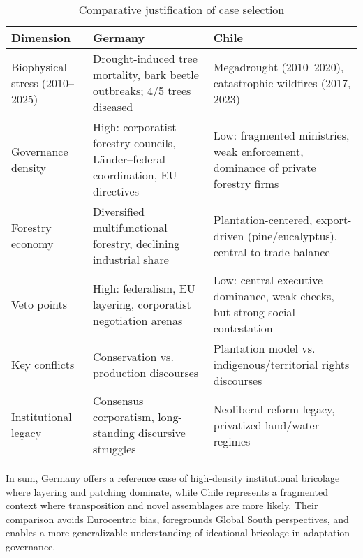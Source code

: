 \begin{table}[h!]
\centering
\caption{Comparative justification of case selection}
\begin{tabular}{@{}p{4cm}p{5cm}p{5cm}@{}}
\toprule
\textbf{Dimension} & \textbf{Germany} & \textbf{Chile} \\ \midrule
Biophysical stress (2010--2025) & Drought-induced tree mortality, bark beetle outbreaks; 4/5 trees diseased \parencite{BMEL2023} & Megadrought (2010--2020), catastrophic wildfires (2017, 2023) \\
Governance density & High: corporatist forestry councils, Länder–federal coordination, EU directives & Low: fragmented ministries, weak enforcement, dominance of private forestry firms \\
Forestry economy & Diversified multifunctional forestry, declining industrial share & Plantation-centered, export-driven (pine/eucalyptus), central to trade balance \\
Veto points & High: federalism, EU layering, corporatist negotiation arenas & Low: central executive dominance, weak checks, but strong social contestation \\
Key conflicts & Conservation vs. production discourses & Plantation model vs. indigenous/territorial rights discourses \\
Institutional legacy & Consensus corporatism, long-standing discursive struggles \parencite{Winkel2011} & Neoliberal reform legacy, privatized land/water regimes \parencite{Manuschevich2016} \\
\bottomrule
\end{tabular}
\end{table}

In sum, Germany offers a reference case of high-density institutional 
bricolage where layering and patching dominate, while Chile represents 
a fragmented context where transposition and novel assemblages are 
more likely. 
Their comparison avoids Eurocentric bias, foregrounds Global South 
perspectives, and enables a more generalizable understanding of 
ideational bricolage in adaptation governance.